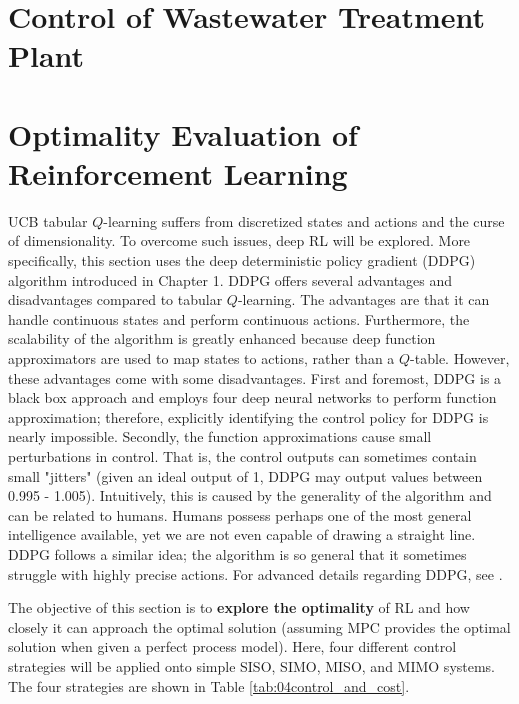 \section{Control of Wastewater Treatment Plant}


















\section{Optimality Evaluation of Reinforcement Learning}
UCB tabular $Q$-learning suffers from discretized states and actions and the curse of dimensionality.  To overcome such issues, deep RL will be explored.  More specifically, this section uses the deep deterministic policy gradient (DDPG) algorithm introduced in Chapter 1. DDPG offers several advantages and disadvantages compared to tabular $Q$-learning.  The advantages are that it can handle continuous states and perform continuous actions. Furthermore, the scalability of the algorithm is greatly enhanced because deep function approximators are used to map states to actions, rather than a $Q$-table. However, these advantages come with some disadvantages.  First and foremost, DDPG is a black box approach and employs four deep neural networks to perform function approximation; therefore, explicitly identifying the control policy for DDPG is nearly impossible. Secondly, the function approximations cause small perturbations in control.  That is, the control outputs can sometimes contain small "jitters" (given an ideal output of 1, DDPG may output values between 0.995 - 1.005).  Intuitively, this is caused by the generality of the algorithm and can be related to humans.  Humans possess perhaps one of the most general intelligence available, yet we are not even capable of drawing a straight line. DDPG follows a similar idea; the algorithm is so general that it sometimes struggle with highly precise actions. For advanced details regarding DDPG, see \cite{ddpg}.  

The objective of this section is to \textbf{explore the optimality} of RL and how closely it can approach the optimal solution (assuming MPC provides the optimal solution when given a perfect process model).  Here, four different control strategies will be applied onto simple SISO, SIMO, MISO, and MIMO systems. The four strategies are shown in Table \ref{tab:04control_and_cost}.

